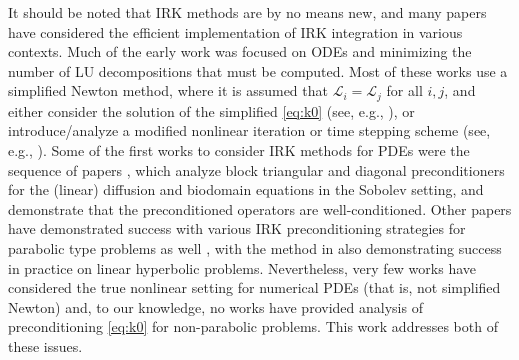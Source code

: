 \documentclass[review]{siamart}
\begin{document}
It should be noted that IRK methods are by no means new, and many papers have
considered the efficient implementation of IRK integration in various contexts.
Much of the early work was focused on ODEs and minimizing the number of LU
decompositions that must be computed. Most of these works use a simplified
Newton method, where it is assumed that $\mathcal{L}_i = \mathcal{L}_j$ for all
$i,j$, and either consider the solution of the simplified \eqref{eq:k0} (see,
e.g., \cite{varah79,butcher76,bickart77,houwen97b,jay99}), or introduce/analyze
a modified nonlinear iteration or time stepping scheme (see, e.g.,
\cite{cooper83,pinto95,pinto96,cooper90,hoffmann97,jay00}). Some of the first
works to consider IRK methods for PDEs were the sequence of papers
\cite{mardel07,nissen11,staff06}, which analyze block triangular and diagonal
preconditioners for the (linear) diffusion and biodomain equations in the
Sobolev setting, and demonstrate that the preconditioned operators are
well-conditioned. Other papers have demonstrated success with various IRK
preconditioning strategies for parabolic type problems as well
\cite{vanlent05,chen14,exh,8jp,27n}, with the method in \cite{exh} also
demonstrating success in practice on linear hyperbolic problems. Nevertheless,
very few works have considered the true nonlinear setting for numerical PDEs
(that is, not simplified Newton) and, to our knowledge, no works have provided
analysis of preconditioning \eqref{eq:k0} for non-parabolic problems. This work
addresses both of these issues.


\end{document}
